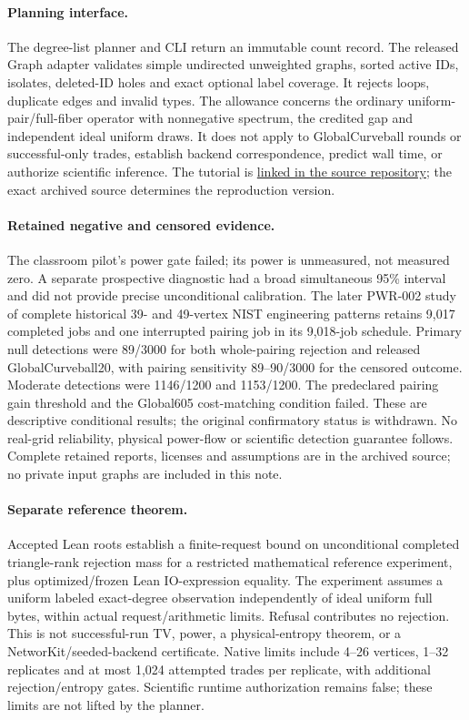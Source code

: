 \documentclass[11pt]{article}
\begin{document}
\paragraph{Planning interface.} The degree-list planner and CLI return an immutable count record. The released Graph adapter validates simple undirected unweighted graphs, sorted active IDs, isolates, deleted-ID holes and exact optional label coverage. It rejects loops, duplicate edges and invalid types. The allowance concerns the ordinary uniform-pair/full-fiber operator with nonnegative spectrum, the credited gap and independent ideal uniform draws. It does not apply to GlobalCurveball rounds or successful-only trades, establish backend correspondence, predict wall time, or authorize scientific inference. The tutorial is \href{https://github.com/DaniilKi/curveball-error-budget/blob/main/docs/QUICKSTART.md}{linked in the source repository}; the exact archived source determines the reproduction version.

\paragraph{Retained negative and censored evidence.} The classroom pilot's power gate failed; its power is unmeasured, not measured zero. A separate prospective diagnostic had a broad simultaneous 95\% interval and did not provide precise unconditional calibration. The later PWR-002 study of complete historical 39- and 49-vertex NIST engineering patterns retains 9,017 completed jobs and one interrupted pairing job in its 9,018-job schedule. Primary null detections were 89/3000 for both whole-pairing rejection and released GlobalCurveball20, with pairing sensitivity 89--90/3000 for the censored outcome. Moderate detections were 1146/1200 and 1153/1200. The predeclared pairing gain threshold and the Global605 cost-matching condition failed. These are descriptive conditional results; the original confirmatory status is withdrawn. No real-grid reliability, physical power-flow or scientific detection guarantee follows. Complete retained reports, licenses and assumptions are in the archived source; no private input graphs are included in this note.

\paragraph{Separate reference theorem.} Accepted Lean roots establish a finite-request bound on unconditional completed triangle-rank rejection mass for a restricted mathematical reference experiment, plus optimized/frozen Lean IO-expression equality. The experiment assumes a uniform labeled exact-degree observation independently of ideal uniform full bytes, within actual request/arithmetic limits. Refusal contributes no rejection. This is not successful-run TV, power, a physical-entropy theorem, or a NetworKit/seeded-backend certificate. Native limits include 4--26 vertices, 1--32 replicates and at most 1,024 attempted trades per replicate, with additional rejection/entropy gates. Scientific runtime authorization remains false; these limits are not lifted by the planner.
\end{document}
